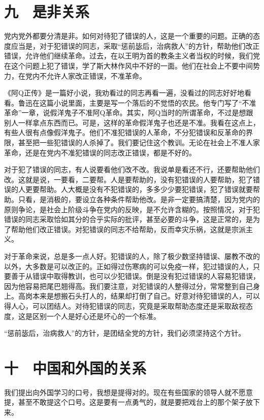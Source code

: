 \section{九　是非关系}

党内党外都要分清是非。如何对待犯了错误的人，这是一个重要的问题。正确的态度应当是，对于犯错误的同志，采取“惩前毖后，治病救人”的方针，帮助他们改正错误，允许他们继续革命。过去，在以王明为首的教条主义者当权的时候，我们党在这个问题上犯了错误，学了斯大林作风中不好的一面。他们在社会上不要中间势力，在党内不允许人家改正错误，不准革命。

《阿Q正传》是一篇好小说，我劝看过的同志再看一遍，没看过的同志好好地看看。鲁迅在这篇小说里面，主要是写一个落后的不觉悟的农民。他专门写了“不准革命”一章，说假洋鬼子不准阿Q革命。其实，阿Q当时的所谓革命，不过是想跟别人一样拿点东西而已。可是，这样的革命假洋鬼子也还是不准。我看在这点上，有些人很有点像假洋鬼子。他们不准犯错误的人革命，不分犯错误和反革命的界限，甚至把一些犯错误的人杀掉了。我们要记住这个教训。无论在社会上不准人家革命，还是在党内不准犯错误的同志改正错误，都是不好的。

对于犯了错误的同志，有人说要看他们改不改。我说单是看还不行，还要帮助他们改。这就是说，一要看，二要帮。人是要帮助的，没有犯错误的人要帮助，犯了错误的人更要帮助。人大概是没有不犯错误的，多多少少要犯错误，犯了错误就要帮助。只看，是消极的，要设立各种条件帮助他改。是非一定要搞清楚，因为党内的原则争论，是社会上阶级斗争在党内的反映，是不允许含糊的。按照情况，对于犯错误的同志采取恰如其分的合乎实际的批评，甚至必要的斗争，这是正常的，是为了帮助他们改正错误。对犯错误的同志不给帮助，反而幸灾乐祸，这就是宗派主义。

对于革命来说，总是多一点人好。犯错误的人，除了极少数坚持错误、屡教不改的以外，大多数是可以改正的。正如得过伤寒病的可以免疫一样，犯过错误的人，只要善于从错误中取得教训，也可以少犯错误。倒是没有犯过错误的人容易犯错误，因为他容易把尾巴翘得高。我们要注意，对犯错误的人整得过分，常常整到自己身上。高岗本来是想搬石头打人的，结果却打倒了自己。好意对待犯错误的人，可以得人心，可以团结人。对待犯错误的同志，究竟是采取帮助态度还是采取敌视态度，这是区别一个人是好心还是坏心的一个标准。

“惩前毖后，治病救人”的方针，是团结全党的方针，我们必须坚持这个方针。

\section{十　中国和外国的关系}

我们提出向外国学习的口号，我想是提得对的。现在有些国家的领导人就不愿意提，甚至不敢提这个口号。这是要有一点勇气的，就是要把戏台上的那个架子放下来。

